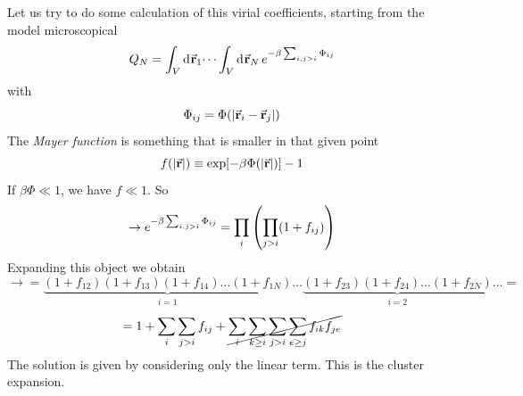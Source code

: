 \documentclass[../main/main.tex]{subfiles}
\begin{document}
Let us try to do some calculation of this virial coefficients, starting from the model microscopical
\begin{equation}
  Q_N = \int_{V}^{} \dd[]{\va{r}_1} \dots \int_{V}^{} \dd[]{\va{r}_N}  e^{-\beta \sum_{i,j > i}^{} \Phi _{ij} }
\end{equation}
with
\begin{equation}
  \Phi _{ij} = \Phi ( \abs{\va{r}_i - \va{r}_j} )
\end{equation}
The \emph{Mayer function}  is something that is smaller in that given point
\begin{equation}
  f (\abs{\va{r}} ) \equiv \exp [ - \beta \Phi ( \abs{\va{r}} )] -1
\end{equation}
If \( \beta \Phi \ll 1 \), we have \( f \ll 1 \). So
\begin{equation}
  \rightarrow  e^{-\beta \sum_{i,j > i}^{} \Phi _{ij} } = \prod_{i}^{} \qty(\prod_{j>i}^{} (1+ f_{ij})  )
\end{equation}
Expanding this object we obtain
\begin{equation}
  \rightarrow = \underbrace{(1+f_{12})(1+f_{13}) (1+ f_{14}) \dots ( 1 + f_{1N })}_{i=1}   \dots \underbrace{(1+f_{23}) (1+ f_{24}) \dots ( 1 + f_{2N })}_{i=2} \dots =
\end{equation}
\begin{equation}
  = 1 + \sum_{i}^{} \sum_{j>i}^{} f_{ij} + \cancel{\sum_{i}^{} \sum_{k \ge i}^{} \sum_{j > i}^{} \sum_{e \ge j}^{} f_{ik} f_{je}       }
\end{equation}
The solution is given by considering only the linear term. This is the cluster expansion.
\end{document}
